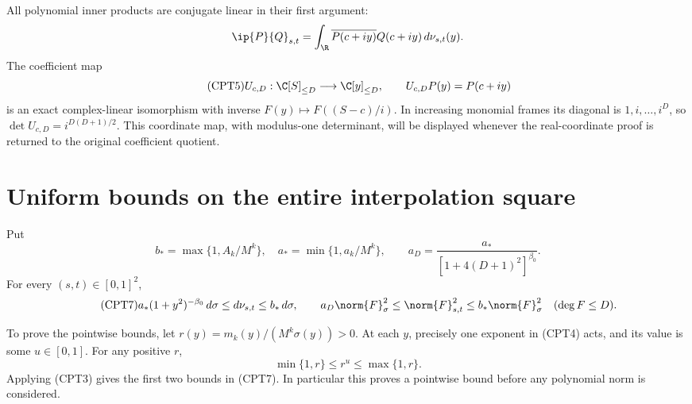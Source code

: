 All polynomial inner products are conjugate linear in their first
argument:
\[
 \ip{P}{Q}_{s,t}
 =\int_{\R}\overline{P(c+iy)}Q(c+iy)\,d\nu_{s,t}(y).
\]
The coefficient map
\begin{equation}\tag{CPT5}
 U_{c,D}:\C[S]_{\le D}\longrightarrow\C[y]_{\le D},
 \qquad U_{c,D}P(y)=P(c+iy)
\end{equation}
is an exact complex-linear isomorphism with inverse
\(F(y)\mapsto F((S-c)/i)\).  In increasing monomial frames its
diagonal is \(1,i,\ldots,i^D\), so
\(\det U_{c,D}=i^{D(D+1)/2}\).  This coordinate map, with modulus-one
determinant, will be displayed whenever the real-coordinate proof is
returned to the original coefficient quotient.

\section{Uniform bounds on the entire interpolation square}

Put
\begin{equation}\tag{CPT6}
 b_*=\max\{1,A_k/M^k\},\quad a_*=\min\{1,a_k/M^k\},
 \qquad
 a_D=\frac{a_*}{[1+4(D+1)^2]^{\beta_0}}.
\end{equation}
For every \((s,t)\in[0,1]^2\),
\begin{equation}\tag{CPT7}
 a_*(1+y^2)^{-\beta_0}\,d\sigma
 \le d\nu_{s,t}\le b_*\,d\sigma,\qquad
 a_D\norm{F}_\sigma^2\le\norm{F}_{s,t}^2
 \le b_*\norm{F}_\sigma^2\quad(\deg F\le D).
\end{equation}

To prove the pointwise bounds, let
\(r(y)=m_k(y)/(M^k\sigma(y))>0\).
At each \(y\), precisely one exponent in (CPT4) acts, and its value
is some \(u\in[0,1]\).  For any positive \(r\),
\[
 \min\{1,r\}\le r^u\le\max\{1,r\}.
\]
Applying (CPT3) gives the first two bounds in (CPT7).
In particular this proves a pointwise bound before any polynomial norm
is considered.

